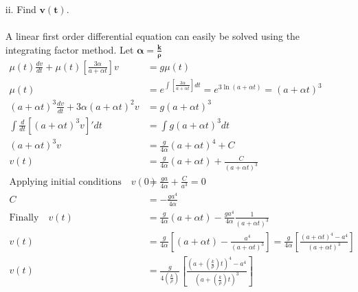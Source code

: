 \documentclass[]{article}
\begin{document}
{\begin{enumerate}
\begin{enumerate}
						\paragraph{} Which is true as the only force acting on the raindrop is acceleration due to gravity, $\bm{ma = mg}$. \\
	\clearpage
					\item[ii.] Find $\bm{v(t)}$.
						\paragraph{} A linear first order differential equation can easily be solved using the integrating factor method. Let $\bm{\alpha = \frac{k}{\rho}}$
						\begin{equation*}
							\begin{split}
								\mu(t)\frac{dv}{dt} + \mu(t)\left[ \frac{3 \alpha}{a + \alpha t} \right] v &= g\mu(t) \\
								\mu(t) &= e^{\int \left[ \frac{3 \alpha}{a + \alpha t} \right] dt} 
								= e^{3 \ln \left( a + \alpha t \right)} 
								= \left( a + \alpha t \right)^3 \\
								\left( a + \alpha t \right)^3 \frac{dv}{dt} + 3 \alpha\left( a + \alpha t \right)^2 v &= g \left( a + \alpha t \right)^3 \\
								\int \frac{d}{dt} \left[ \left( a + \alpha t \right)^3 v \right]' dt &= \int g \left( a + \alpha t \right)^3 dt \\
								\left( a + \alpha t \right)^3 v &= \frac{g}{4\alpha} \left( a + \alpha t \right)^4 + C \\
								v(t) &= \frac{g}{4\alpha} \left( a + \alpha t \right) + \frac{C}{\left( a + \alpha t \right)^3 } \\
								\text{Applying initial conditions} \quad v(0) &= \frac{ga}{4\alpha} + \frac{C}{a^3} = 0 \\
								C &= -\frac{ga^4}{4\alpha} \\
								\text{Finally} \quad v(t) &= \frac{g}{4\alpha} \left( a + \alpha t \right) - \frac{ga^4}{4\alpha} \frac{1}{\left( a + \alpha t \right)^3 } \\
								v(t) &= \frac{g}{4\alpha} \left[ \left( a + \alpha t \right) - \frac{a^4}{\left( a + \alpha t \right)^3 } \right]
								= \frac{g}{4\alpha} \left[ \frac{ \left( a + \alpha t \right)^4 - a^4}{\left( a + \alpha t \right)^3 } \right] \\
								v(t) &= \frac{g}{4\left( \frac{k}{\rho} \right)} \left[ \frac{ \left( a + \left( \frac{k}{\rho} \right) t \right)^4 - a^4}{\left( a + \left( \frac{k}{\rho} \right) t \right)^3 } \right] \\
							\end{split}
						\end{equation*} \\
						

\end{enumerate}
\end{enumerate}}
\end{document}

